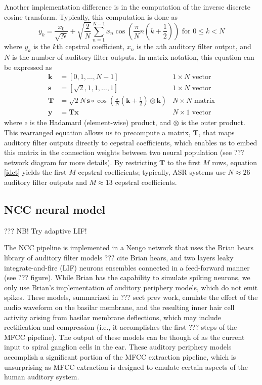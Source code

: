 Another implementation difference
is in the computation of
the inverse discrete cosine transform.
Typically, this computation is done as
\begin{equation}
  y_k = \frac{x_0}{\sqrt{N}} + \sqrt{\frac{2}{N}} \sum_{n=1}^{N-1}
  x_n \cos \left( \frac{\pi}{N} n \left( k + \frac{1}{2} \right) \right)
  \text{ for } 0 \le k < N
\end{equation}
where $y_k$ is the $k$th cepstral coefficient,
$x_n$ is the $n$th auditory filter output,
and $N$ is the number of auditory filter outputs.
In matrix notation,
this equation can be expressed as
\begin{align}
  \label{idct}
  \mathbf{k} &= \left[ 0, 1, \ldots, N-1 \right] & 1 \times N \text{ vector} \nonumber \\
  \mathbf{s} &= \left[ \sqrt{2}, 1, 1, \ldots, 1 \right] & 1 \times N \text{ vector} \nonumber \\
  \mathbf{T} &= \sqrt{2}{N} \, \mathbf{s} \circ \cos \left( \frac{\pi}{N} \left(
    \mathbf{k} + \frac{1}{2} \right) \otimes \mathbf{k} \right)
    & N \times N \text{ matrix} \nonumber \\
  \mathbf{y} &= \mathbf{T}\mathbf{x} & N \times 1 \text{ vector}
\end{align}
where $\circ$ is the Hadamard (element-wise) product,
and $\otimes$ is the outer product.
This rearranged equation
allows us to precompute a matrix, $\mathbf{T}$,
that maps auditory filter outputs
directly to cepstral coefficients,
which enables us to embed this matrix
in the connection weights between
two neural population
(see ??? network diagram for more details).
By restricting $\mathbf{T}$
to the first $M$ rows,
equation \eqref{idct} yields the first
$M$ cepstral coefficients;
typically, ASR systems
use $N \approx 26$ auditory filter outputs
and $M \approx 13$ cepstral coefficients.

\subsection{NCC neural model}

??? NB! Try adaptive LIF!

The NCC pipeline is implemented
in a Nengo network that uses
the Brian hears library
of auditory filter models
??? cite Brian hears,
and two layers
leaky integrate-and-fire (LIF) neurons ensembles
connected in a feed-forward manner
(see ??? figure).
While Brian has the capability
to simulate spiking neurons,
we only use Brian's implementation of
auditory periphery models,
which do not emit spikes.
These models,
summarized in ??? sect prev work,
emulate the effect of the
audio waveform on the basilar membrane,
and the resulting inner hair cell activity
arising from basilar membrane deflections,
which may include rectification
and compression
(i.e., it accomplishes the first
??? steps of the MFCC pipeline).
The output of these models
can be though of as
the current input
to spiral ganglion cells in the ear.
These auditory periphery models
accomplish a significant portion
of the MFCC extraction pipeline,
which is unsurprising as MFCC extraction
is designed to emulate certain aspects
of the human auditory system.

